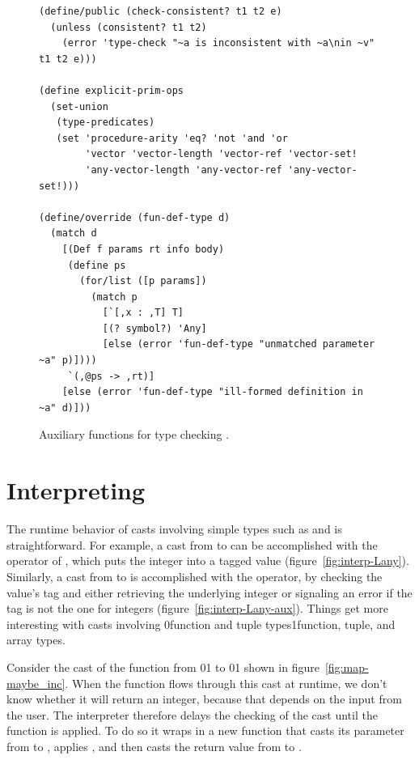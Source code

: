 \documentclass[7x10]{TimesAPriori_MIT}%
\def\racketEd{0}
\def\pythonEd{1}
\providecommand{\BookEdition}{1}
\let\edition\BookEdition
\newcommand{\racket}[1]{{\if\edition\racketEd{#1}\fi}}
\newcommand{\pythonColor}[0]{}
\newcommand{\python}[1]{{\if\edition\pythonEd\pythonColor #1\fi}}
\numberwithin{theorem}{chapter}
\numberwithin{definition}{chapter}
\numberwithin{equation}{chapter}
\begin{document}
{\begin{figure}[tbp]
\begin{tcolorbox}[colback=white]
\begin{lstlisting}
(define/public (check-consistent? t1 t2 e)
  (unless (consistent? t1 t2)
    (error 'type-check "~a is inconsistent with ~a\nin ~v" t1 t2 e)))

(define explicit-prim-ops
  (set-union
   (type-predicates)
   (set 'procedure-arity 'eq? 'not 'and 'or
        'vector 'vector-length 'vector-ref 'vector-set!
        'any-vector-length 'any-vector-ref 'any-vector-set!)))

(define/override (fun-def-type d)
  (match d
    [(Def f params rt info body)
     (define ps
       (for/list ([p params])
         (match p
           [`[,x : ,T] T]
           [(? symbol?) 'Any]
           [else (error 'fun-def-type "unmatched parameter ~a" p)])))
     `(,@ps -> ,rt)]
    [else (error 'fun-def-type "ill-formed definition in ~a" d)]))
\end{lstlisting}
\end{tcolorbox}

\caption{Auxiliary functions for type checking \LangGrad{}.}
\label{fig:type-check-Lgradual-aux}
\end{figure}

\fi}



\section{Interpreting \LangCast{} }
\label{sec:interp-casts}

The runtime behavior of casts involving simple types such as
\INTTY{} and \BOOLTY{} is straightforward.  For example, a
cast from \INTTY{} to \CANYTY{} can be accomplished with the
 operator of \LangAny{}, which puts the integer into a
tagged value (figure~\ref{fig:interp-Lany}). Similarly, a cast from
\CANYTY{} to \INTTY{} is accomplished with the 
operator, by checking the value's tag and either retrieving
the underlying integer or signaling an error if the tag is not the
one for integers (figure~\ref{fig:interp-Lany-aux}).
%
Things get more interesting with casts involving
\racket{function and tuple types}\python{function, tuple, and array types}.

Consider the cast of the function  from
\racket{}\python{}
to
\racket{}\python{}
shown in figure~\ref{fig:map-maybe_inc}.
When the  function flows through
this cast at runtime, we don't know whether it will return
an integer, because that depends on the input from the user.
The \LangCast{} interpreter therefore delays the checking
of the cast until the function is applied. To do so it
wraps  in a new function that casts its parameter
from \INTTY{} to \CANYTY{}, applies , and then
casts the return value from \CANYTY{} to \INTTY{}.
\end{document}
